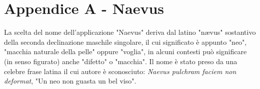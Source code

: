 \appendix
\chapter{Appendice A - Naevus}
\label{app:nomeAppendiceA}

La scelta del nome dell'applicazione "Naevus" deriva dal latino "nævus" sostantivo della seconda declinazione maschile singolare, il cui significato è appunto "neo", "macchia naturale della pelle" oppure "voglia", in alcuni contesti può significare (in senso figurato) anche "difetto" o "macchia".
Il nome è stato preso da una celebre frase latina il cui autore è sconosciuto:
\newline
\textit{Naevus pulchram faciem non deformat},
\newline
"Un neo non guasta un bel viso".